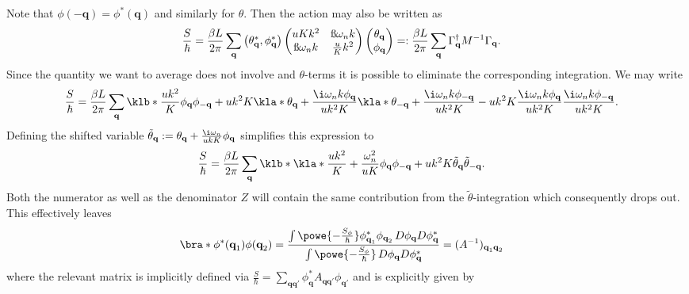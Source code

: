 \documentclass[english, parskip=full]{scrartcl}
\begin{document}
Note that $\phi(-\textbf{q}) = \phi^\ast(\textbf{q})$ and similarly for $\theta$.
Then the action may also be written as
\begin{align}
\frac{S}{\hbar} &= \frac{\beta L}{2\pi} \sum_{\textbf{q}} \begin{pmatrix}
\theta_\textbf{q}^\ast, \phi_\textbf{q}^\ast
\end{pmatrix} \begin{pmatrix}
uKk^2 & \i\omega_n k \\ \i\omega_n k & \frac{u}{K}k^2
\end{pmatrix} \begin{pmatrix}
\theta_\textbf{q} \\ \phi_\textbf{q}
\end{pmatrix} =: \frac{\beta L}{2\pi} \sum_\textbf{q} \Gamma_\textbf{q}^\dagger M^{-1} \Gamma_\textbf{q}.
\end{align}
Since the quantity we want to average does not involve and $\theta$-terms it is possible to eliminate the corresponding integration.
We may write
\begin{align}
\frac{S}{\hbar} &= \frac{\beta L}{2\pi} \sum_\textbf{q} \klb*{\frac{uk^2}{K} \phi_\textbf{q} \phi_{-\textbf{q}} + uk^2 K \kla*{\theta_\textbf{q} + \frac{\i\omega_nk\phi_\textbf{q}}{uk^2 K}} \kla*{\theta_{-\textbf{q}} + \frac{\i\omega_nk\phi_{-\textbf{q}}}{uk^2 K}} - uk^2 K \frac{\i\omega_nk\phi_\textbf{q}}{uk^2 K} \frac{ \i\omega_nk \phi_{-\textbf{q}}}{uk^2 K} }.
\end{align}
Defining the shifted variable $\tilde{\theta}_\textbf{q} := \theta_\textbf{q} + \frac{\i\omega_n}{ukK} \phi_\textbf{q}$ simplifies this expression to
\begin{align}
\frac{S}{\hbar} &= \frac{\beta L}{2\pi} \sum_\textbf{q} \klb*{ \kla*{\frac{uk^2}{K} + \frac{\omega_n^2}{uK} } \phi_\textbf{q} \phi_{-\textbf{q}} + uk^2K \tilde{\theta}_\textbf{q} \tilde{\theta}_{-\textbf{q}} }.
\end{align}
Both the numerator as well as the denominator $Z$ will contain the same contribution from the $\tilde{\theta}$-integration which consequently drops out.
This effectively leaves
\begin{align}
\bra*{\phi^\ast(\textbf{q}_1) \phi(\textbf{q}_2)} &= \frac{\int \powe{-\frac{S_\phi}{\hbar}} \phi_{\textbf{q}_1}^\ast \phi_{\textbf{q}_2} \, D\phi_\textbf{q} D\phi_\textbf{q}^\ast }{\int \powe{- \frac{S_\phi}{\hbar}}  \, D\phi_\textbf{q} D\phi_\textbf{q}^\ast} = (A^{-1})_{\textbf{q}_1 \textbf{q}_2}
\end{align}
where the relevant matrix is implicitly defined via $\frac{S}{\hbar} = \sum_{\textbf{q}\textbf{q}'} \phi_\textbf{q}^\ast A_{\textbf{q} \textbf{q}'} \phi_{\textbf{q}'}$ and is explicitly given by
\end{document}
